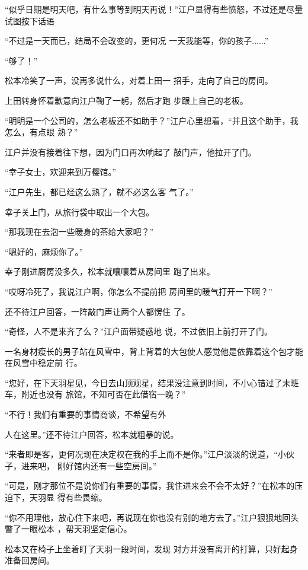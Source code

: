 \documentclass{article}
\begin{document}
“似乎日期是明天吧，有什么事等到明天再说！”江户显得有些愤怒，不过还是尽量试图按下话语

“不过是一天而已，结局不会改变的，更何况
一天我能等，你的孩子......” 


“够了！” 

松本冷笑了一声，没再多说什么，对着上田一
招手，走向了自己的房间。 

\newpage

上田转身怀着歉意向江户鞠了一躬，然后才跑
步跟上自己的老板。 

“明明是一个公司的，怎么老板还不如助手？”江户心里想着，“并且这个助手，我怎么，有点眼
熟？” 

江户并没有接着往下想，因为门口再次响起了
敲门声，他拉开了门。 


“幸子女士，欢迎来到万樱馆。” 

“江户先生，都已经这么熟了，就不必这么客
气了。” 


幸子关上门，从旅行袋中取出一个大包。 


“那我现在去泡一些暖身的茶给大家吧？” 


“嗯好的，麻烦你了。” 

\newpage

幸子刚进厨房没多久，松本就嚷嚷着从房间里
跑了出来。 

“哎呀冷死了，我说江户啊，你怎么不提前把
房间里的暖气打开一下啊？” 

还不待江户回答，一阵敲门声让两个人都愣住
了。 

“奇怪，人不是来齐了么？”江户面带疑惑地
说，不过依旧上前打开了门。 

一名身材瘦长的男子站在风雪中，背上背着的大包使人感觉他是依靠着这个包才能在风雪中稳定前
行。 

“您好，在下天羽星见，今日去山顶观星，结果没注意到时间，不小心错过了末班车，附近也没有
旅馆，不知可否在此借宿一晚？” 

“不行！我们有重要的事情商谈，不希望有外
\newpage

人在这里。”还不待江户回答，松本就粗暴的说。 

“来者即是客，更何况现在决定权在我的手上而不是你。”江户淡淡的说道，“小伙子，进来吧，
刚好馆内还有一些空房间。” 

“可是，刚才那位不是说你们有重要的事情，我住进来会不会不太好？”在松本的压迫下，天羽显
得有些畏缩。 

“你不用理他，放心住下来吧，再说现在你也没有别的地方去了。”江户狠狠地回头瞥了一眼松本
，帮天羽坚定信心。 

松本又在椅子上坐着盯了天羽一段时间，发现
对方并没有离开的打算，只好起身准备回房间。 
\end{document}
